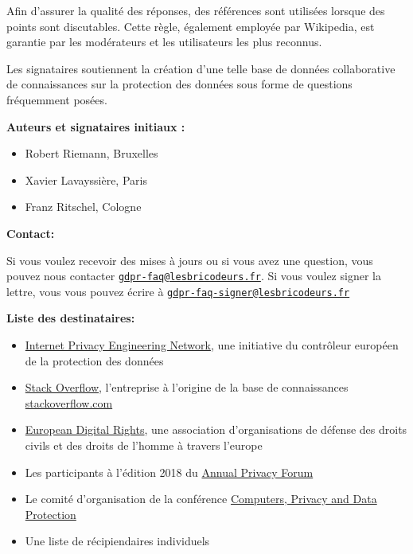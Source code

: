 \documentclass{scrlttr2}
\let\tightlist\relax
\begin{document}
\begin{letter}{}
Afin d'assurer la qualité des réponses, des références sont utilisées
lorsque des points sont discutables. Cette règle, également employée par
Wikipedia, est garantie par les modérateurs et les utilisateurs les plus
reconnus.

Les signataires soutiennent la création d'une telle base de données
collaborative de connaissances sur la protection des données sous forme
de questions fréquemment posées.

\textbf{Auteurs et signataires initiaux :}

\begin{itemize}
\tightlist
\item
  Robert Riemann, Bruxelles
\item
  Xavier Lavayssière, Paris
\item
  Franz Ritschel, Cologne
\end{itemize}

\textbf{Contact:}

Si vous voulez recevoir des mises à jours ou si vous avez une question,
vous pouvez nous contacter
\href{mailto:gdpr-faq@lesbricodeurs.fr}{\nolinkurl{gdpr-faq@lesbricodeurs.fr}}.
Si vous voulez signer la lettre, vous vous pouvez écrire à
\href{mailto:gdpr-faq-signer@lesbricodeurs.fr}{\nolinkurl{gdpr-faq-signer@lesbricodeurs.fr}}

\newpage

\textbf{Liste des destinataires:}

\begin{itemize}
\tightlist
\item
  \href{https://edps.europa.eu/data-protection/ipen-internet-privacy-engineering-network_en}{Internet
  Privacy Engineering Network}, une initiative du contrôleur européen de
  la protection des données
\item
  \href{https://stackoverflow.com/company}{Stack Overflow}, l'entreprise
  à l'origine de la base de connaissances
  \href{http://stackoverflow.com/}{stackoverflow.com}
\item
  \href{https://edri.org/}{European Digital Rights}, une association
  d'organisations de défense des droits civils et des droits de l'homme
  à travers l'europe
\item
  Les participants à l'édition 2018 du
  \href{http://privacyforum.eu/}{Annual Privacy Forum}
\item
  Le comité d'organisation de la conférence
  \href{http://www.cpdpconferences.org/}{Computers, Privacy and Data
  Protection}
\item
  Une liste de récipiendaires individuels
\end{itemize}

\end{letter}
\end{document}

